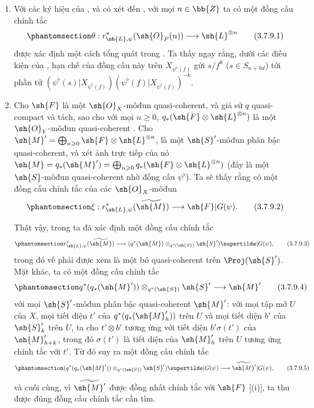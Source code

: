 \documentclass[oneside,10pt]{amsart}
\renewcommand{\geq}{\geqslant}
\let\EGAOriginalLabel\label
\renewcommand{\label}[1]{\phantomsection\EGAOriginalLabel{#1}}
\begin{document}
\begin{remarks}[3.7.9]
\label{II.3.7.9}
\medskip\noindent
\begin{enumerate}
  \item[(i)] Với các ký hiệu của , và có xét đến , với mọi $n\in\bb{Z}$ ta có một đồng cấu chính tắc
    \[
    \label{II.3.7.9.1}
      \theta:r_{\sh{L},\psi}^*(\sh{O}_P(n))\longrightarrow
      \sh{L}^{\otimes n}
    \tag{3.7.9.1}
    \]
    được xác định một cách tổng quát trong .
    Ta thấy ngay rằng, dưới các điều kiện của , hạn chế của đồng cấu này trên $X_{\psi^\flat(f)}$ gửi $s/f^k$ ($s\in S_{n+kd}$) tới phần tử $(\psi^\flat(s)|X_{\psi^\flat(f)})(\psi^\flat(f)|X_{\psi^\flat(f)})^{-k}$.
  \item[(ii)] Cho $\sh{F}$ là một $\sh{O}_X$-môđun quasi-coherent, và giả sử $q$ quasi-compact và tách, sao cho với mọi $n\geq0$, $q_*(\sh{F}\otimes\sh{L}^{\otimes n})$ là một $\sh{O}_Y$-môđun quasi-coherent .
    Cho $\sh{M}'=\bigoplus_{n\geq0}\sh{F}\otimes\sh{L}^{\otimes n}$, là một $\sh{S}'$-môđun phân bậc quasi-coherent, và xét ảnh trực tiếp của nó
    $\sh{M}=q_*(\sh{M}')=\bigoplus_{n\geq0}q_*(\sh{F}\otimes\sh{L}^{\otimes n})$ (đây là một $\sh{S}$-môđun quasi-coherent nhờ đồng cấu $\psi^\flat$).
    Ta sẽ thấy rằng có một đồng cấu chính tắc của các $\sh{O}_X$-môđun
    \[
    \label{II.3.7.9.2}
      \xi:r_{\sh{L},\psi}^*(\widetilde{\sh{M}})
      \longrightarrow\sh{F}|G(\psi).
    \tag{3.7.9.2}
    \]

    Thật vậy, trong  ta đã xác định một đồng cấu chính tắc
    \[
    \label{II.3.7.9.3}
      r_{\sh{L},\psi}^*(\widetilde{\sh{M}})
      \longrightarrow
      (q^*(\sh{M})\otimes_{q^*(\sh{S})}\sh{S}')\supertilde|G(\psi),
    \tag{3.7.9.3}
    \]
    trong đó vế phải được xem là một bó quasi-coherent trên $\Proj(\sh{S}')$.
    Mặt khác, ta có một đồng cấu chính tắc
    \[
    \label{II.3.7.9.4}
      q^*(q_*(\sh{M}'))\otimes_{q^*(\sh{S})}\sh{S}'
      \longrightarrow\sh{M}'
    \tag{3.7.9.4}
    \]
    với mọi $\sh{S}'$-môđun phân bậc quasi-coherent $\sh{M}'$:
    với mọi tập mở $U$ của $X$, mọi tiết diện $t'$ của $q^*(q_*(\sh{M}'_h))$ trên $U$ và mọi tiết diện $b'$ của $\sh{S}'_k$ trên $U$, ta cho $t'\otimes b'$ tương ứng với tiết diện $b'\sigma(t')$ của $\sh{M}'_{h+k}$, trong đó $\sigma(t')$ là tiết diện của $\sh{M}'_h$ trên $U$ tương ứng chính tắc  với $t'$.
    Từ đó suy ra một đồng cấu chính tắc
    \[
    \label{II.3.7.9.5}
      (q^*(q_*(\sh{M}'))\otimes_{q^*(\sh{S})}\sh{S}')\supertilde|G(\psi)
      \longrightarrow\widetilde{\sh{M}'}|G(\psi),
    \tag{3.7.9.5}
    \]
    và cuối cùng, vì $\widetilde{\sh{M}'}$ được đồng nhất chính tắc với $\sh{F}$ [(i)], ta thu được đúng đồng cấu chính tắc cần tìm.


\end{enumerate}
\end{remarks}
\end{document}
